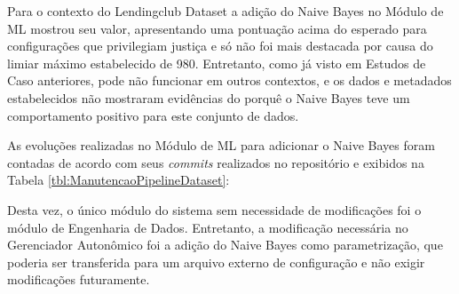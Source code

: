 \documentclass[portugues]{ic-tese}
\begin{document}
Para o contexto do Lendingclub Dataset a adição do Naive Bayes no Módulo de ML mostrou seu valor, apresentando uma pontuação acima do esperado para configurações que privilegiam justiça e só não foi mais destacada por causa do limiar máximo estabelecido de 980. Entretanto, como já visto em Estudos de Caso anteriores, pode não funcionar em outros contextos, e os dados e metadados estabelecidos não mostraram evidências do porquê o Naive Bayes teve um comportamento positivo para este conjunto de dados.

As evoluções realizadas no Módulo de ML para adicionar o Naive Bayes foram contadas de acordo com seus \textit{commits} realizados no repositório e exibidos  na Tabela \ref{tbl:ManutencaoPipelineDataset}:

\begin{table}[H]
\begin{center}
  \caption{Quantidade de modificações realizadas ao adicionar um novo algoritmo ao Módulo de ML}
\label{tbl:ManutencaoPipelineCaso3}
\end{center}
\end{table}

Desta vez, o único módulo do sistema sem necessidade de modificações foi o módulo de Engenharia de Dados. Entretanto, a modificação necessária no Gerenciador Autonômico foi a adição do Naive Bayes como parametrização, que poderia ser transferida para um arquivo externo de configuração e não exigir modificações futuramente.
\end{document}
